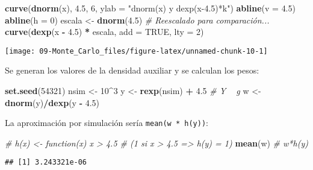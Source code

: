 \documentclass[
]{book}
\newenvironment{Shaded}{\begin{snugshade}}{\end{snugshade}}
\newcommand{\CommentTok}[1]{\textcolor[rgb]{0.56,0.35,0.01}{\textit{#1}}}
\newcommand{\DataTypeTok}[1]{\textcolor[rgb]{0.13,0.29,0.53}{#1}}
\newcommand{\DecValTok}[1]{\textcolor[rgb]{0.00,0.00,0.81}{#1}}
\newcommand{\FloatTok}[1]{\textcolor[rgb]{0.00,0.00,0.81}{#1}}
\newcommand{\KeywordTok}[1]{\textcolor[rgb]{0.13,0.29,0.53}{\textbf{#1}}}
\newcommand{\NormalTok}[1]{#1}
\newcommand{\OperatorTok}[1]{\textcolor[rgb]{0.81,0.36,0.00}{\textbf{#1}}}
\newcommand{\OtherTok}[1]{\textcolor[rgb]{0.56,0.35,0.01}{#1}}
\newcommand{\StringTok}[1]{\textcolor[rgb]{0.31,0.60,0.02}{#1}}
\theoremstyle{break}
\theoremstyle{definition}
\theoremstyle{definition}
\theoremstyle{definition}
\theoremstyle{remark}
\begin{document}
\begin{Shaded}
\begin{Highlighting}[]
\KeywordTok{curve}\NormalTok{(}\KeywordTok{dnorm}\NormalTok{(x), }\FloatTok{4.5}\NormalTok{, }\DecValTok{6}\NormalTok{, }\DataTypeTok{ylab =} \StringTok{"dnorm(x) y dexp(x-4.5)*k"}\NormalTok{)}
\KeywordTok{abline}\NormalTok{(}\DataTypeTok{v =} \FloatTok{4.5}\NormalTok{)}
\KeywordTok{abline}\NormalTok{(}\DataTypeTok{h =} \DecValTok{0}\NormalTok{)}
\NormalTok{escala <-}\StringTok{ }\KeywordTok{dnorm}\NormalTok{(}\FloatTok{4.5}\NormalTok{)  }\CommentTok{# Reescalado para comparación...}
\KeywordTok{curve}\NormalTok{(}\KeywordTok{dexp}\NormalTok{(x }\OperatorTok{-}\StringTok{ }\FloatTok{4.5}\NormalTok{) }\OperatorTok{*}\StringTok{ }\NormalTok{escala, }\DataTypeTok{add =} \OtherTok{TRUE}\NormalTok{, }\DataTypeTok{lty =} \DecValTok{2}\NormalTok{)  }
\end{Highlighting}
\end{Shaded}

\begin{center}\texttt{[image: 09-Monte\_Carlo\_files/figure-latex/unnamed-chunk-10-1]} \end{center}

Se generan los valores de la densidad auxiliar y se calculan los pesos:

\begin{Shaded}
\begin{Highlighting}[]
\KeywordTok{set.seed}\NormalTok{(}\DecValTok{54321}\NormalTok{)}
\NormalTok{nsim <-}\StringTok{ }\DecValTok{10}\OperatorTok{^}\DecValTok{3}
\NormalTok{y <-}\StringTok{ }\KeywordTok{rexp}\NormalTok{(nsim) }\OperatorTok{+}\StringTok{ }\FloatTok{4.5}    \CommentTok{#  Y ~ g}
\NormalTok{w <-}\StringTok{ }\KeywordTok{dnorm}\NormalTok{(y)}\OperatorTok{/}\KeywordTok{dexp}\NormalTok{(y }\OperatorTok{-}\StringTok{ }\FloatTok{4.5}\NormalTok{)}
\end{Highlighting}
\end{Shaded}

La aproximación por simulación sería \texttt{mean(w\ *\ h(y))}:

\begin{Shaded}
\begin{Highlighting}[]
\CommentTok{# h(x) <- function(x) x > 4.5  # (1 si x > 4.5 => h(y) = 1)}
\KeywordTok{mean}\NormalTok{(w) }\CommentTok{# w*h(y)}
\end{Highlighting}
\end{Shaded}

\begin{verbatim}
## [1] 3.243321e-06
\end{verbatim}
\end{document}
